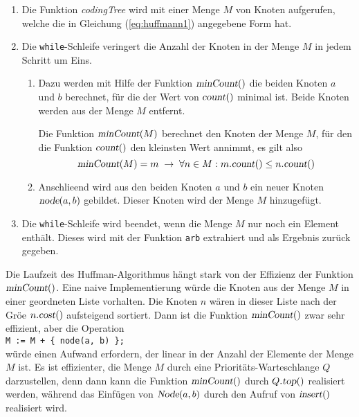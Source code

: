 \begin{enumerate}
\item Die Funktion \textsl{codingTree} wird mit einer Menge $M$ von Knoten aufgerufen,
      welche die in Gleichung (\ref{eq:huffmann1}) angegebene Form hat.
\item Die \texttt{while}-Schleife veringert die Anzahl der Knoten in der Menge $M$
      in jedem Schritt um Eins.  
      \begin{enumerate}
      \item Dazu werden mit Hilfe der Funktion $\textsl{minCount}()$ die
            beiden Knoten $a$ und $b$ berechnet, f\"ur die der Wert von $\textsl{count}()$ minimal
            ist.  Beide Knoten werden aus der Menge $M$ entfernt.

            Die Funktion $\textsl{minCount}(M)$ berechnet den Knoten der Menge $M$, f\"ur den 
            die Funktion $\textsl{count}()$ den kleinsten Wert annimmt, es gilt also
            \[ \textsl{minCount}(M) = m \;\rightarrow\; 
               \forall n \in M: m.\textsl{count}() \leq n.\textsl{count}() \]
      \item Anschlie\3end wird aus den beiden Knoten $a$ und $b$ ein neuer Knoten 
            $\textsl{node}(a,b)$ gebildet.
            Dieser Knoten wird der Menge $M$ hinzugef\"ugt.
      \end{enumerate}
\item Die \texttt{while}-Schleife wird beendet, wenn die Menge $M$ nur noch ein Element enth\"alt.
      Dieses wird mit der Funktion \texttt{arb} extrahiert und als Ergebnis zur\"uck gegeben.
\end{enumerate}
Die Laufzeit des Huffman-Algorithmus h\"angt stark von der Effizienz der Funktion $\textsl{minCount}()$.
Eine naive Implementierung w\"urde die Knoten aus der Menge $M$ in einer geordneten Liste vorhalten.
Die Knoten $n$ w\"aren in dieser Liste nach der Gr\"o\3e $n.\textsl{cost}()$ aufsteigend sortiert.
Dann ist die Funktion $\textsl{minCount}()$ zwar sehr effizient, aber die Operation
\\[0.2cm]
\hspace*{1.3cm}
\texttt{M := M + \{ node(a, b) \};}
\\[0.2cm]
w\"urde einen Aufwand erfordern, der linear in der Anzahl der Elemente der Menge $M$ ist.
Es ist effizienter, die Menge $M$ durch eine Priorit\"ats-Warteschlange $Q$ darzustellen, denn
dann kann die Funktion $\textsl{minCount}()$ durch $Q.\textsl{top}()$ realisiert werden, w\"ahrend
das Einf\"ugen von $\textsl{Node}(a,b)$ durch den Aufruf von $\textsl{insert}()$ realisiert wird.

